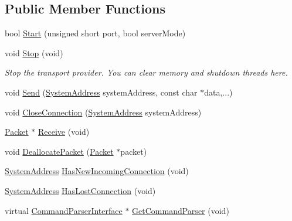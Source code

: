 \subsection*{Public Member Functions}
\begin{DoxyCompactItemize}
\item 
bool \hyperlink{class_rak_net_1_1_rak_net_transport2_abb58cb4fd2ea3250c389b8ef277dad95}{Start} (unsigned short port, bool server\-Mode)
\item 
\hypertarget{class_rak_net_1_1_rak_net_transport2_a3de211dcbde531971013a237ebebbc4c}{void \hyperlink{class_rak_net_1_1_rak_net_transport2_a3de211dcbde531971013a237ebebbc4c}{Stop} (void)}\label{class_rak_net_1_1_rak_net_transport2_a3de211dcbde531971013a237ebebbc4c}

\begin{DoxyCompactList}\small\item\em Stop the transport provider. You can clear memory and shutdown threads here. \end{DoxyCompactList}\item 
void \hyperlink{class_rak_net_1_1_rak_net_transport2_a7ec569657d7add40b0cee7278bc04c35}{Send} (\hyperlink{struct_rak_net_1_1_system_address}{System\-Address} system\-Address, const char $\ast$data,...)
\item 
void \hyperlink{class_rak_net_1_1_rak_net_transport2_a73d6c3178bfc051d9a143e855fd7ace9}{Close\-Connection} (\hyperlink{struct_rak_net_1_1_system_address}{System\-Address} system\-Address)
\item 
\hyperlink{struct_rak_net_1_1_packet}{Packet} $\ast$ \hyperlink{class_rak_net_1_1_rak_net_transport2_a1f51afa7fad8d03ffc3b814af206b7d3}{Receive} (void)
\item 
void \hyperlink{class_rak_net_1_1_rak_net_transport2_af87746cec490429fe1332cc1e6a6b40e}{Deallocate\-Packet} (\hyperlink{struct_rak_net_1_1_packet}{Packet} $\ast$packet)
\item 
\hyperlink{struct_rak_net_1_1_system_address}{System\-Address} \hyperlink{class_rak_net_1_1_rak_net_transport2_a964e1e7302513fc9aa878980473cd782}{Has\-New\-Incoming\-Connection} (void)
\item 
\hyperlink{struct_rak_net_1_1_system_address}{System\-Address} \hyperlink{class_rak_net_1_1_rak_net_transport2_a4a80043c5d0395af7fa07a0dc5fd24c8}{Has\-Lost\-Connection} (void)
\item 
virtual \hyperlink{class_rak_net_1_1_command_parser_interface}{Command\-Parser\-Interface} $\ast$ \hyperlink{class_rak_net_1_1_rak_net_transport2_a7f8567ba431056ef96da1536d0cf01d7}{Get\-Command\-Parser} (void)

\end{DoxyCompactItemize}
